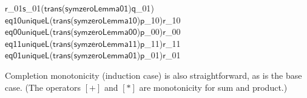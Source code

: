 \documentclass{CSML}
\numberwithin{theorem}{section}
\newcommand{\Varid}[1]{\mathit{#1}}
\def\resethooks{\global\let\SaveRestoreHook\empty
  \global\let\ColumnHook\empty}
\newcommand{\hsindent}[1]{\quad}\let\hspre\empty
\renewcommand\Varid[1]{\ensuremath{\mathsf{#1}}}
\begin{document}
\begin{hscode}
\>[6]{}\hsindent{8}{}\<[14]\>[14]{}\Varid{r}_{01}\;\mathrel{=}\;\Varid{s}_{01}\;({}\<[27]\>[27]{}\Varid{trans}\;(\Varid{sym}\;\Varid{zeroLemma01})\;\Varid{q}_{01}){}\<[E]\\
\>[6]{}\hsindent{8}{}\<[14]\>[14]{}\Varid{eq10}\;\mathrel{=}\;\Varid{uniqueL}\;(\Varid{trans}\;(\Varid{sym}\;\Varid{zeroLemma10})\;{}\<[55]\>[55]{}\Varid{p}_{10})\;{}\<[61]\>[61]{}\Varid{r}_{10}{}\<[E]\\
\>[6]{}\hsindent{8}{}\<[14]\>[14]{}\Varid{eq00}\;\mathrel{=}\;\Varid{uniqueL}\;(\Varid{trans}\;(\Varid{sym}\;\Varid{zeroLemma00})\;{}\<[55]\>[55]{}\Varid{p}_{00})\;{}\<[61]\>[61]{}\Varid{r}_{00}{}\<[E]\\
\>[6]{}\hsindent{8}{}\<[14]\>[14]{}\Varid{eq11}\;\mathrel{=}\;\Varid{uniqueL}\;(\Varid{trans}\;(\Varid{sym}\;\Varid{zeroLemma11})\;{}\<[55]\>[55]{}\Varid{p}_{11})\;{}\<[61]\>[61]{}\Varid{r}_{11}{}\<[E]\\
\>[6]{}\hsindent{8}{}\<[14]\>[14]{}\Varid{eq01}\;\mathrel{=}\;\Varid{uniqueL}\;(\Varid{trans}\;(\Varid{sym}\;\Varid{zeroLemma01})\;{}\<[55]\>[55]{}\Varid{p}_{01})\;{}\<[61]\>[61]{}\Varid{r}_{01}{}\<[E]\ColumnHook
\end{hscode}\resethooks
Completion monotonicity (induction case) is also straightforward, as is the base case.
(The operators \ensuremath{\Varid{[+]}} and \ensuremath{\Varid{[*]}} are monotonicity for sum and product.)
\end{document}

